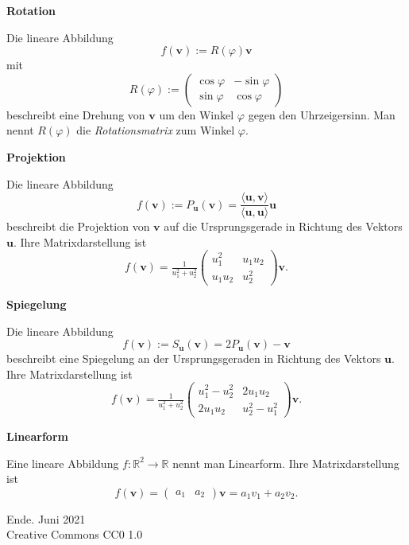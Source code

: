\documentclass[9pt]{beamer}
\newcommand{\modest}[1]{{\small\color{gray}#1}}
\newcommand{\bv}[1]{\mathbf{#1}}
\newcommand{\R}{\mathbb R}
\newcommand{\strong}[1]{\textsf{\textbf{#1}}}
\newcommand{\parspace}{\vspace{0.8em}}
\begin{document}
\begin{frame}
\strong{Rotation}

\parspace
Die lineare Abbildung
\[f(\bv v) := R(\varphi)\bv v\]
mit
\[R(\varphi) := \begin{pmatrix}
\cos\varphi & -\sin\varphi\\
\sin\varphi & \cos\varphi
\end{pmatrix}\]
beschreibt eine Drehung von $\bv v$ um den Winkel $\varphi$ gegen
den Uhrzeigersinn. Man nennt $R(\varphi)$ die \emph{Rotationsmatrix}
zum Winkel $\varphi$.
\end{frame}

\begin{frame}
\strong{Projektion}

\parspace
Die lineare Abbildung
\[f(\bv v) := P_{\bv u}(\bv v) =
\frac{\langle\bv u,\bv v\rangle}{\langle\bv u,\bv u\rangle}\bv u\]
beschreibt die Projektion von $\bv v$ auf die Ursprungsgerade in
Richtung des Vektors $\bv u$. Ihre Matrixdarstellung ist
\[f(\bv v) = \tfrac{1}{u_1^2+u_2^2}\begin{pmatrix}
u_1^2 & u_1 u_2\\
u_1 u_2 & u_2^2
\end{pmatrix}\bv v.\]
\end{frame}

\begin{frame}
\strong{Spiegelung}

\parspace
Die lineare Abbildung
\[f(\bv v) := S_{\bv u}(\bv v) = 2P_{\bv u}(\bv v) - \bv v\]
beschreibt eine Spiegelung an der Ursprungsgeraden in Richtung
des Vektors $\bv u$. Ihre Matrixdarstellung ist
\[f(\bv v) = \tfrac{1}{u_1^2+u_2^2}\begin{pmatrix}
u_1^2-u_2^2 & 2u_1u_2\\
2u_1u_2 & u_2^2-u_1^2
\end{pmatrix}\bv v.\]
\end{frame}

\begin{frame}
\strong{Linearform}

\parspace
Eine lineare Abbildung $f\colon\R^2\to\R$ nennt man Linearform.
Ihre Matrixdarstellung ist
\[f(\bv v) = \begin{pmatrix}a_1 & a_2\end{pmatrix}\bv v =
a_1 v_1 + a_2 v_2.\]
\end{frame}

\begin{frame}
Ende.
\vfill\hfill\modest{Juni 2021}\\
\hfill\modest{Creative Commons CC0 1.0}
\end{frame}
\end{document}
